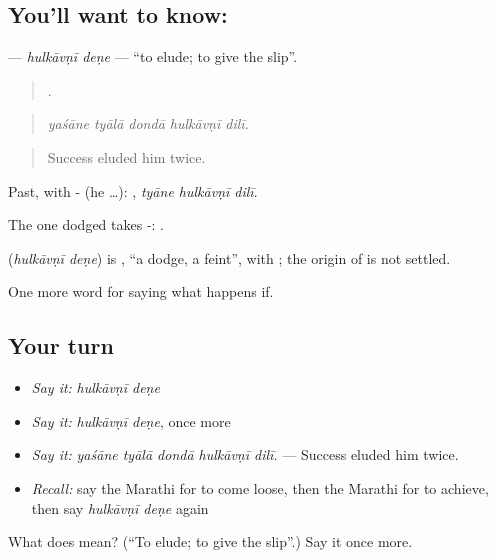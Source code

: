 \subsection*{You'll want to know:  }
\textbf{ } — \emph{hulkāvṇī deṇe} — \textquotedblleft{}to elude; to give the slip\textquotedblright{}.

\begin{quote}
    .
\end{quote}

\begin{quote}
\emph{yaśāne tyālā dondā hulkāvṇī dilī.}
\end{quote}

\begin{quote}
Success eluded him twice.
\end{quote}

Past, with - (he …):   , \emph{tyāne hulkāvṇī dilī}.

The one dodged takes -:   .

\begin{cousinweb}
\textbf{ } (\emph{hulkāvṇī deṇe}) is , \textquotedblleft{}a dodge, a feint\textquotedblright{}, with ; the origin of  is not settled.
\end{cousinweb}

\begin{grammarlens}[title={What you've built}]
One more word for saying what happens if.
\end{grammarlens}

\subsection*{Your turn}
\begin{itemize}
\raggedright
  \item \emph{Say it:} \emph{hulkāvṇī deṇe}
  \item \emph{Say it:} \emph{hulkāvṇī deṇe}, once more
  \item \emph{Say it:} \emph{yaśāne tyālā dondā hulkāvṇī dilī.} — Success eluded him twice.
  \item \emph{Recall:} say the Marathi for to come loose, then the Marathi for to achieve, then say \emph{hulkāvṇī deṇe} again
\end{itemize}

\begin{tcolorbox}[breakable,colback=teal!4,colframe=teal!35!black,title={Before you move on}]
What does   mean? (\textquotedblleft{}To elude; to give the slip\textquotedblright{}.) Say it once more.
\end{tcolorbox}
